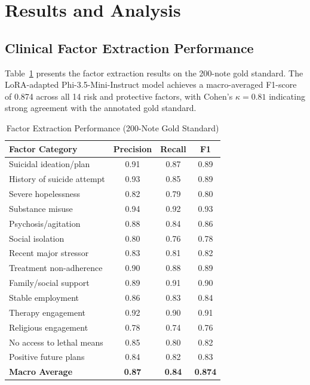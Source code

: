 \documentclass[conference]{IEEEtran}
\begin{document}
\section{Results and Analysis}

\subsection{Clinical Factor Extraction Performance}

Table~\ref{tab:extraction} presents the factor extraction results on the 200-note gold standard. The LoRA-adapted Phi-3.5-Mini-Instruct model achieves a macro-averaged F1-score of 0.874 across all 14 risk and protective factors, with Cohen's $\kappa = 0.81$ indicating strong agreement with the annotated gold standard.

\begin{table}[t]
\caption{Factor Extraction Performance (200-Note Gold Standard)}
\label{tab:extraction}
\centering
\begin{tabular}{lccc}
\hline
\textbf{Factor Category} & \textbf{Precision} & \textbf{Recall} & \textbf{F1} \\
\hline
Suicidal ideation/plan & 0.91 & 0.87 & 0.89 \\
History of suicide attempt & 0.93 & 0.85 & 0.89 \\
Severe hopelessness & 0.82 & 0.79 & 0.80 \\
Substance misuse & 0.94 & 0.92 & 0.93 \\
Psychosis/agitation & 0.88 & 0.84 & 0.86 \\
Social isolation & 0.80 & 0.76 & 0.78 \\
Recent major stressor & 0.83 & 0.81 & 0.82 \\
Treatment non-adherence & 0.90 & 0.88 & 0.89 \\
\hline
Family/social support & 0.89 & 0.91 & 0.90 \\
Stable employment & 0.86 & 0.83 & 0.84 \\
Therapy engagement & 0.92 & 0.90 & 0.91 \\
Religious engagement & 0.78 & 0.74 & 0.76 \\
No access to lethal means & 0.85 & 0.80 & 0.82 \\
Positive future plans & 0.84 & 0.82 & 0.83 \\
\hline
\textbf{Macro Average} & \textbf{0.87} & \textbf{0.84} & \textbf{0.874} \\
\hline
\end{tabular}
\end{table}
\end{document}
